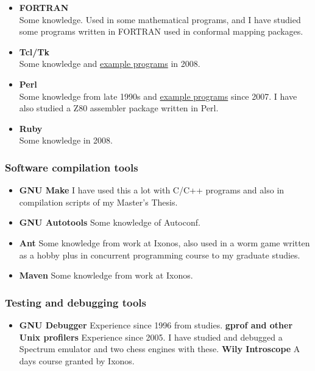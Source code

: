 \documentclass[a4paper,12pt]{article}
\begin{document}
\begin{itemize}
{\bf J2ME} \\
Some knowledge.
\item
{\bf FORTRAN} \\
Some knowledge. Used in some mathematical programs, and I have studied some programs
written in FORTRAN used in conformal mapping packages.
\item
{\bf Tcl/Tk} \\
Some knowledge and \href{http://math.tkk.fi/~mnummeli/tite/tcltk.html}
{example programs} in 2008.
\item
{\bf Perl} \\
Some knowledge from late 1990s and \href{http://math.tkk.fi/~mnummeli/tite/perl.html}
{example programs} since 2007. I have also studied
a Z80 assembler package written in Perl.
\item
{\bf Ruby} \\
Some knowledge in 2008.
\end{itemize}

\subsubsection*{Software compilation tools}
\begin{itemize}
\item
{\bf GNU Make}
I have used this a lot with C/C++ programs and also in compilation scripts of
my Master's Thesis.
\item
{\bf GNU Autotools}
Some knowledge of Autoconf.
\item
{\bf Ant}
Some knowledge from work at Ixonos, also used in a worm game written as a hobby
plus in concurrent programming course to my graduate studies.
\item
{\bf Maven}
Some knowledge from work at Ixonos.
\end{itemize}

\subsubsection*{Testing and debugging tools}
\begin{itemize}
\item
{\bf GNU Debugger}
Experience since 1996 from studies.
{\bf gprof and other Unix profilers}
Experience since 2005. I have studied and debugged a Spectrum emulator and
two chess engines with these.
{\bf Wily Introscope}
A days course granted by Ixonos.
\end{itemize}
\end{document}
